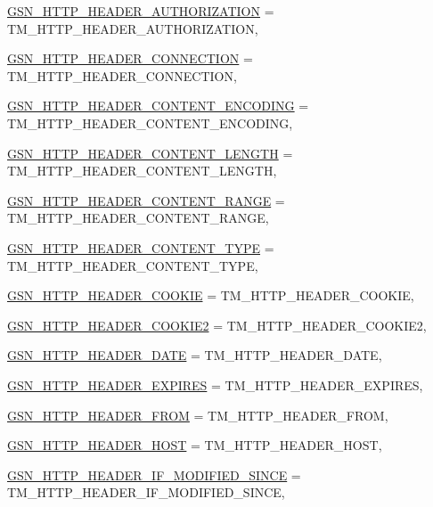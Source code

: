 \begin{DoxyCompactItemize}
\hyperlink{a00665_gga46b2de5d0afbd35d93a0426f601866d9a9b11b60fe52d9c14a7ef06c761ddcce6}{GSN\_\-HTTP\_\-HEADER\_\-AUTHORIZATION} =  TM\_\-HTTP\_\-HEADER\_\-AUTHORIZATION, 
\par
\hyperlink{a00665_gga46b2de5d0afbd35d93a0426f601866d9a9d21b3c05d210927fcb202ddd663387d}{GSN\_\-HTTP\_\-HEADER\_\-CONNECTION} =  TM\_\-HTTP\_\-HEADER\_\-CONNECTION, 
\par
\hyperlink{a00665_gga46b2de5d0afbd35d93a0426f601866d9acad0f6aa40ef1d57670b23a6b3731803}{GSN\_\-HTTP\_\-HEADER\_\-CONTENT\_\-ENCODING} =  TM\_\-HTTP\_\-HEADER\_\-CONTENT\_\-ENCODING, 
\par
\hyperlink{a00665_gga46b2de5d0afbd35d93a0426f601866d9ad65a9f445a4f849993a146435bd4fe62}{GSN\_\-HTTP\_\-HEADER\_\-CONTENT\_\-LENGTH} =  TM\_\-HTTP\_\-HEADER\_\-CONTENT\_\-LENGTH, 
\par
\hyperlink{a00665_gga46b2de5d0afbd35d93a0426f601866d9ace5b9560efddf28d46f88a3a307ee9cc}{GSN\_\-HTTP\_\-HEADER\_\-CONTENT\_\-RANGE} =  TM\_\-HTTP\_\-HEADER\_\-CONTENT\_\-RANGE, 
\par
\hyperlink{a00665_gga46b2de5d0afbd35d93a0426f601866d9a41e0c48678f057a903472aa3d9d411d2}{GSN\_\-HTTP\_\-HEADER\_\-CONTENT\_\-TYPE} =  TM\_\-HTTP\_\-HEADER\_\-CONTENT\_\-TYPE, 
\par
\hyperlink{a00665_gga46b2de5d0afbd35d93a0426f601866d9aba0d523897285b1cd639d7e7451ada60}{GSN\_\-HTTP\_\-HEADER\_\-COOKIE} =  TM\_\-HTTP\_\-HEADER\_\-COOKIE, 
\par
\hyperlink{a00665_gga46b2de5d0afbd35d93a0426f601866d9a9fe9812a4b8449ef704ae6a1bcfba380}{GSN\_\-HTTP\_\-HEADER\_\-COOKIE2} =  TM\_\-HTTP\_\-HEADER\_\-COOKIE2, 
\par
\hyperlink{a00665_gga46b2de5d0afbd35d93a0426f601866d9a07d5377552d44adf62b3c2800a0b9246}{GSN\_\-HTTP\_\-HEADER\_\-DATE} =  TM\_\-HTTP\_\-HEADER\_\-DATE, 
\par
\hyperlink{a00665_gga46b2de5d0afbd35d93a0426f601866d9a4112f66e4022a8294f847e0737d97917}{GSN\_\-HTTP\_\-HEADER\_\-EXPIRES} =  TM\_\-HTTP\_\-HEADER\_\-EXPIRES, 
\par
\hyperlink{a00665_gga46b2de5d0afbd35d93a0426f601866d9a6d3bf025c58069b6aeeb8d57bc703422}{GSN\_\-HTTP\_\-HEADER\_\-FROM} =  TM\_\-HTTP\_\-HEADER\_\-FROM, 
\par
\hyperlink{a00665_gga46b2de5d0afbd35d93a0426f601866d9a349cb2dd2ec9621b83a391f7e2f32fa3}{GSN\_\-HTTP\_\-HEADER\_\-HOST} =  TM\_\-HTTP\_\-HEADER\_\-HOST, 
\par
\hyperlink{a00665_gga46b2de5d0afbd35d93a0426f601866d9a718ced6afeff6b6d172da428c8a10559}{GSN\_\-HTTP\_\-HEADER\_\-IF\_\-MODIFIED\_\-SINCE} =  TM\_\-HTTP\_\-HEADER\_\-IF\_\-MODIFIED\_\-SINCE, 

\end{DoxyCompactItemize}
